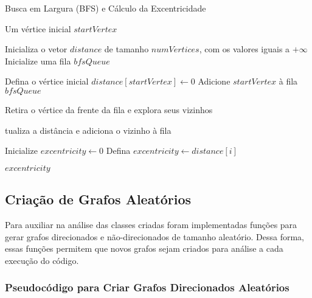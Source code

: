 \documentclass[12pt]{article}
\begin{document}
\begin{algorithm}
    \caption{Busca em Largura (BFS) e Cálculo da Excentricidade}
    \label{alg:BFS_calculoDaExcentricidade}
    \begin{algorithmic}
        \Require Um vértice inicial $startVertex$
        
        \State Inicializa o vetor $distance$ de tamanho $numVertices$, com os valores iguais a $+\infty$
        \State Inicialize uma fila $bfsQueue$
        
        \State Defina o vértice inicial $distance[startVertex] \gets 0$
        \State Adicione $startVertex$ à fila $bfsQueue$
        
            \State Retira o vértice da frente da fila e explora seus vizinhos
            
                    \State tualiza a distância e adiciona o vizinho à fila
                \EndIf
            \EndFor
        \EndWhile
        
        \State Inicialize $excentricity \gets 0$
                \State Defina $excentricity \gets distance[i]$
            \EndIf
        \EndFor
        
        \State \Return $excentricity$
    \end{algorithmic}
\end{algorithm}

\subsection{Criação de Grafos Aleatórios}

Para auxiliar na análise das classes criadas foram implementadas funções para gerar grafos direcionados e não-direcionados de tamanho aleatório. Dessa forma, essas funções permitem que novos grafos sejam criados para análise a cada execução do código.

\newpage

\subsubsection{Pseudocódigo para Criar Grafos Direcionados Aleatórios}
\end{document}
